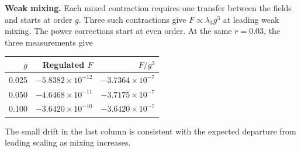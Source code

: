 \textbf{Weak mixing.} Each mixed contraction requires one transfer between the fields and starts at order $g$. Three such contractions give $F\propto\lambda_3 g^3$ at leading weak mixing. The power corrections start at even order. At the same $r=0.03$, the three measurements give
\begin{center}\begin{tabular}{rrr}\toprule $g$ & Regulated $F$ & $F/g^3$ \\\midrule
0.025 & $-5.8382\times10^{-12}$ & $-3.7364\times10^{-7}$\\
0.050 & $-4.6468\times10^{-11}$ & $-3.7175\times10^{-7}$\\
0.100 & $-3.6420\times10^{-10}$ & $-3.6420\times10^{-7}$\\\bottomrule\end{tabular}\end{center}
The small drift in the last column is consistent with the expected departure from leading scaling as mixing increases.
